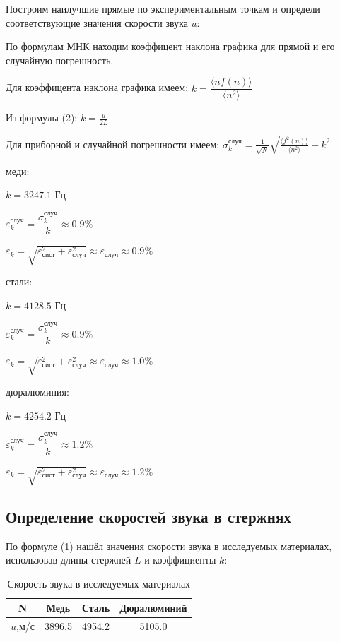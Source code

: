 \documentclass[a4paper]{article}
\begin{document}
\item Построим наилучшие прямые по экспериментальным точкам и
определи соответствующие значения скорости звука $u$:
\item
\item По формулам МНК находим коэффицент наклона графика для прямой и его случайную погрешность.
\item Для коэффицента наклона графика имеем: $k=\dfrac{\langle n f(n) \rangle} {\langle n^2 \rangle}$
\item
\item Из формулы (2): $k = \frac{u}{2L}$
\item Для приборной и случайной погрешности имеем:
$\sigma_k^\text{случ} = \frac{1}{\sqrt{N}}\sqrt{\frac{\langle f^2(n) \rangle}
{\langle n^2 \rangle} - k^2 }$
\item

 меди:
\item $k = 3247.1 \text{ Гц}$
\item$\varepsilon_k^\text{случ} = \dfrac{\sigma_k^\text{случ}}{k} \approx 0.9\% $
\item$\varepsilon_k=\sqrt{\varepsilon_\text{сист}^2+\varepsilon_\text{случ}^2} \approx \varepsilon_\text{случ} \approx 0.9\% $
\item
{} стали:
\item $k = 4128.5 \text{ Гц}$
\item$\varepsilon_k^\text{случ} = \dfrac{\sigma_k^\text{случ}}{k} \approx 0.9\% $
\item$\varepsilon_k=\sqrt{\varepsilon_\text{сист}^2+\varepsilon_\text{случ}^2} \approx \varepsilon_\text{случ} \approx 1.0\% $
\item
{} дюралюминия:
\item $k = 4254.2 \text{ Гц}$
\item$\varepsilon_k^\text{случ} = \dfrac{\sigma_k^\text{случ}}{k} \approx 1.2\% $
\item$\varepsilon_k=\sqrt{\varepsilon_\text{сист}^2+\varepsilon_\text{случ}^2} \approx \varepsilon_\text{случ} \approx 1.2\% $

\subsection{Определение скоростей звука в стержнях}

По формуле (1) нашёл значения скорости звука в исследуемых материалах, использовав длины стержней $L$ и коэффициенты $k$:

\begin{table}[h!]
\centering
\caption{Скорость звука в исследуемых материалах}
\begin{tabular}{|c|c|c|c|}
\hline
N & Медь & Сталь & Дюралюминий \\ \hline
$u$,м/с & 3896.5 & 4954.2 & 5105.0 \\ \hline
\end{tabular}
\end{table}
\end{document}
